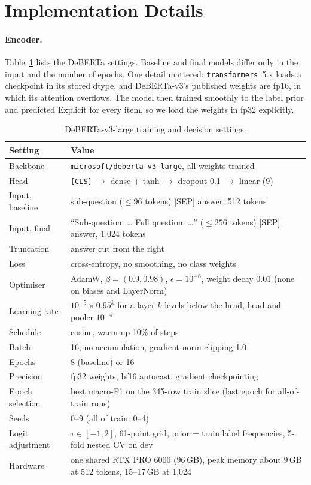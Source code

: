 \section{Implementation Details}
\label{sec:app}

\paragraph{Encoder.}
Table~\ref{tab:app-enc-hparams} lists the DeBERTa settings. Baseline and final models differ only in the input and the number of epochs.
One detail mattered: \texttt{transformers}~5.x loads a checkpoint in its stored dtype, and DeBERTa-v3's published weights are fp16, in which its attention overflows. The model then trained smoothly to the label prior and predicted Explicit for every item, so we load the weights in fp32 explicitly.

\begin{table}[h]
\centering
\footnotesize
\begin{tabular}{@{}lp{}@{}}
\toprule
Setting & Value \tabularnewline
\midrule
Backbone & \raggedright \texttt{microsoft/deberta-v3-large}, all weights trained \tabularnewline
Head & \raggedright \texttt{[CLS]} $\to$ dense + tanh $\to$ dropout 0.1 $\to$ linear (9) \tabularnewline
Input, baseline & \raggedright sub-question (${\le}96$ tokens) [SEP] answer, 512 tokens \tabularnewline
Input, final & \raggedright ``Sub-question: \ldots{} Full question: \ldots'' (${\le}256$ tokens) [SEP] answer, 1,024 tokens \tabularnewline
Truncation & \raggedright answer cut from the right \tabularnewline
Loss & \raggedright cross-entropy, no smoothing, no class weights \tabularnewline
Optimiser & \raggedright AdamW, $\beta=(0.9, 0.98)$, $\epsilon=10^{-6}$, weight decay 0.01 (none on biases and LayerNorm) \tabularnewline
Learning rate & \raggedright $10^{-5}\times0.95^{k}$ for a layer $k$ levels below the head, head and pooler $10^{-4}$ \tabularnewline
Schedule & \raggedright cosine, warm-up 10\% of steps \tabularnewline
Batch & \raggedright 16, no accumulation, gradient-norm clipping 1.0 \tabularnewline
Epochs & \raggedright 8 (baseline) or 16 \tabularnewline
Precision & \raggedright fp32 weights, bf16 autocast, gradient checkpointing \tabularnewline
Epoch selection & \raggedright best macro-F1 on the 345-row train slice (last epoch for all-of-train runs) \tabularnewline
Seeds & \raggedright 0--9 (all of train: 0--4) \tabularnewline
Logit adjustment & \raggedright $\tau\in[-1,2]$, 61-point grid, prior = train label frequencies, 5-fold nested CV on dev \tabularnewline
Hardware & \raggedright one shared RTX PRO 6000 (96\,GB), peak memory about 9\,GB at 512 tokens, 15--17\,GB at 1,024 \tabularnewline
\bottomrule
\end{tabular}
\caption{DeBERTa-v3-large training and decision settings.}
\label{tab:app-enc-hparams}
\end{table}

